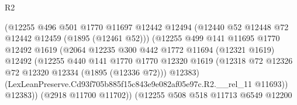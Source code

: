 \begin{lexlean}{R2}
\begin{coremodule}
                                        (@12255
                                          @496
                                          @501
                                          @1770
                                          @11697
                                          @12442
                                          @12494
                                          (@12440 @52 @12448 @72 @12442 @12459 (@1895 (@12461 @52)))
                                          (@12255
                                            @499
                                            @141
                                            @11695
                                            @1770
                                            @12492
                                            @1619
                                            (@2064
                                              @12235
                                              @300
                                              @442
                                              @1772
                                              @11694
                                              (@12321 @1619)
                                              @12492
                                              (@12255
                                                @440
                                                @141
                                                @1770
                                                @1770
                                                @12320
                                                @1619
                                                (@12318
                                                  @72
                                                  @12326
                                                  @72
                                                  @12320
                                                  @12334
                                                  (@1895 (@12336 @72)))
                                                @12383)
                                              (LexLeanPreserve.Cd93f705b885f15c843e9e082af05e97c.R2.__rel_11
                                                @11693))
                                            @12383))
                                        (@2918 @11700 @11702))
                                      (@12255
                                        @508
                                        @518
                                        @11713
                                        @6549
                                        @12200

\end{coremodule}
\end{lexlean}
